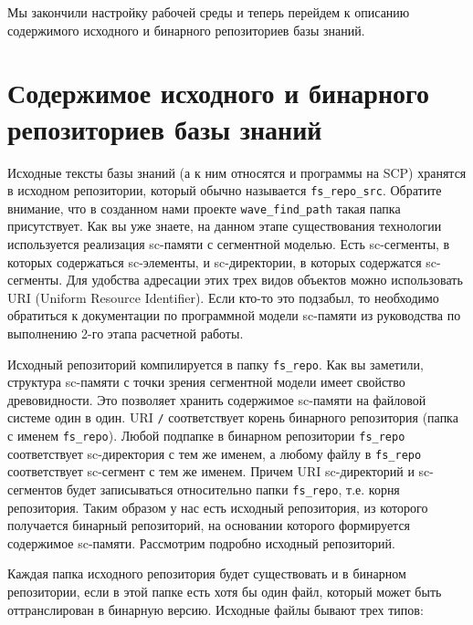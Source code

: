 Мы закончили настройку рабочей среды и теперь перейдем к описанию
содержимого исходного и бинарного репозиториев базы знаний.

\pagebreak

\section{Содержимое исходного и бинарного репозиториев базы знаний}

Исходные тексты базы знаний (а к ним относятся и программы на SCP)
хранятся в исходном репозитории, который обычно называется
\verb|fs_repo_src|. Обратите внимание, что в созданном нами проекте
\verb|wave_find_path| такая папка присутствует. Как вы уже знаете, на
данном этапе существования технологии используется реализация
sc-памяти с сегментной моделью. Есть sc-сегменты, в которых
содержаться sc-элементы, и sc-директории, в которых содержатся
sc-сегменты. Для удобства адресации этих трех видов объектов можно
использовать URI (Uniform Resource Identifier). Если кто-то это
подзабыл, то необходимо обратиться к документации по программной
модели sc-памяти из руководства по выполнению 2-го этапа расчетной
работы.

Исходный репозиторий компилируется в папку \verb|fs_repo|. Как вы
заметили, структура sc-памяти с точки зрения сегментной модели имеет
свойство древовидности. Это позволяет хранить содержимое sc-памяти на
файловой системе один в один. URI \verb|/| соответствует корень
бинарного репозитория (папка с именем \verb|fs_repo|). Любой подпапке
в бинарном репозитории \verb|fs_repo| соответствует sc-директория с
тем же именем, а любому файлу в \verb|fs_repo| соответствует
sc-сегмент с тем же именем. Причем URI sc-директорий и sc-сегментов
будет записываться относительно папки \verb|fs_repo|, т.е. корня
репозитория. Таким образом у нас есть исходный репозитория, из
которого получается бинарный репозиторий, на основании которого
формируется содержимое sc-памяти. Рассмотрим подробно исходный
репозиторий.

Каждая папка исходного репозитория будет существовать и в бинарном
репозитории, если в этой папке есть хотя бы один файл, который может
быть оттранслирован в бинарную версию. Исходные файлы бывают трех
типов:

